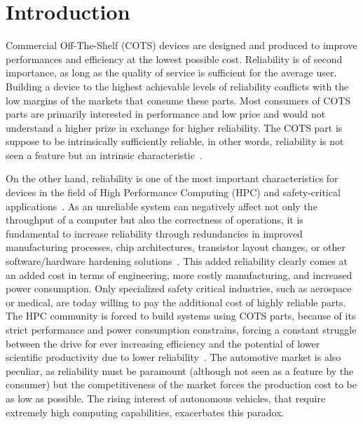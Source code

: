 \section{Introduction}
\label{sec_introduction}

Commercial Off-The-Shelf (COTS) devices are designed and produced to improve performances and efficiency at the lowest possible cost. Reliability is of  second importance, as long as the quality of service is sufficient for the average user. Building a device to the highest achievable levels of reliability conflicts with the low margins of the markets that consume these parts. Most consumers of COTS parts are primarily interested in performance and low price and would not understand a higher prize in exchange for higher reliability. The COTS part is suppose to be intrinsically sufficiently reliable, in other words, reliability is not seen a feature but an intrinsic characteristic~\cite{ziegler2004ser, Baumann2005}. 

On the other hand, reliability is one of the most important characteristics for devices in the field of High Performance Computing (HPC) and safety-critical applications~\cite{toptenexascale, NSF2018, ISO26262}.
As an unreliable system can negatively affect not only the throughput of a computer but also the correctness of operations, it is fundamental to increase reliability through redundancies in improved manufacturing processes, chip architectures, transistor layout changes, or other software/hardware hardening solutions~\cite{ziegler2004ser}. This added reliability clearly comes at an added cost in terms of engineering, more costly manufacturing, and increased power consumption. Only specialized safety critical industries, such as aerospace or medical, are today willing to pay the additional cost of highly
reliable parts. The HPC community is forced to build systems using COTS parts, because of its strict performance and power consumption constrains, forcing a constant struggle between the drive for ever increasing efficiency and the potential of lower scientific productivity due to lower reliability~\cite{snir2014addressing}. The automotive market is also peculiar, as reliability must be paramount (although not seen as a feature by the consumer) but the competitiveness of the market forces the production cost to be as low as possible. The rising interest of autonomous vehicles, that require extremely high computing capabilities, exacerbates this paradox.

